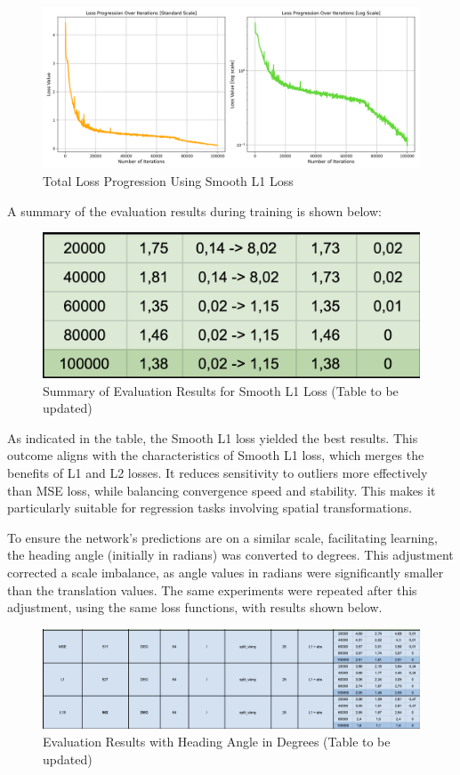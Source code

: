 \begin{figure}[H]
    \centering
    \includegraphics[width=0.75\linewidth]{LateX//figs/loss_total_l1s_progression_comparison.png}
    \caption{Total Loss Progression Using Smooth L1 Loss}
    \label{fig:smooth-l1-total-loss}
\end{figure}

A summary of the evaluation results during training is shown below:

\begin{figure}[H]
    \centering
    \includegraphics[width=0.5\linewidth]{Screenshot 2024-11-14 at 11.50.25.png}
    \caption{Summary of Evaluation Results for Smooth L1 Loss (Table to be updated)}
    \label{fig:smooth-l1-evaluation}
\end{figure}

As indicated in the table, the Smooth L1 loss yielded the best results. This outcome aligns with the characteristics of Smooth L1 loss, which merges the benefits of L1 and L2 losses. It reduces sensitivity to outliers more effectively than MSE loss, while balancing convergence speed and stability. This makes it particularly suitable for regression tasks involving spatial transformations.

To ensure the network’s predictions are on a similar scale, facilitating learning, the heading angle (initially in radians) was converted to degrees. This adjustment corrected a scale imbalance, as angle values in radians were significantly smaller than the translation values. The same experiments were repeated after this adjustment, using the same loss functions, with results shown below.

\begin{figure}[H]
    \centering
    \includegraphics[width=1\linewidth]{Screenshot 2024-11-14 at 11.52.27.png}
    \caption{Evaluation Results with Heading Angle in Degrees (Table to be updated)}
    \label{fig:degree-evaluation-results}
\end{figure}

